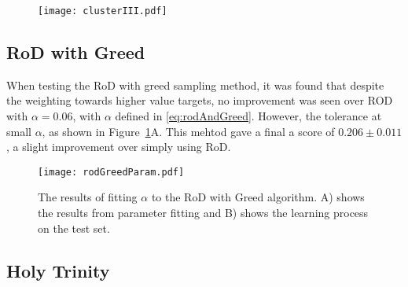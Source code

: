 \begin{figure}[H]
    \begin{center}
        \texttt{[image: clusterIII.pdf]}
    \end{center}
\end{figure}

\subsection{RoD with Greed}
When testing the RoD with greed sampling method, it was found that despite the weighting towards higher value targets, no improvement was seen over ROD with $\alpha{}=0.06$, with $\alpha$ defined in \ref{eq:rodAndGreed}. However, the tolerance at small $\alpha$, as shown in Figure~\ref{fig:rogreed}A. This mehtod gave a final a score of ${0.206\pm{}0.011}$, a slight improvement over simply using RoD.

\begin{figure}[H]
    \begin{center}
        \texttt{[image: rodGreedParam.pdf]}
        \caption[RoD with Greed]{The results of fitting $\alpha{}$ to the RoD with Greed algorithm. A) shows the results from parameter fitting and B) shows the learning process on the test set.}
        \label{fig:rogreed}
    \end{center}
\end{figure}

\subsection{Holy Trinity}
\blindtext[1]


